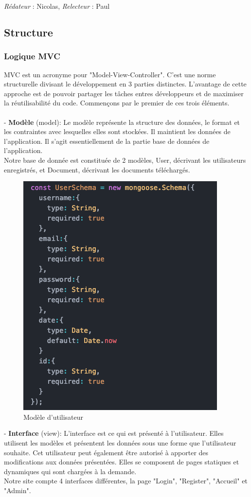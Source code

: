 \documentclass[oneside,a4paper,13pt]{article}
\begin{document}
\smallbreak\textit{Rédateur} : Nicolas, \textit{Relecteur} : Paul
\subsection{Structure}



\subsubsection{Logique MVC}

MVC est un acronyme pour "Model-View-Controller". C'est une norme structurelle divisant le développement en 3 parties distinctes. L'avantage de cette approche est de pouvoir partager les tâches entres développeurs et de maximiser la réutilisabilité du code. Commençons par le premier de ces trois éléments. \\ \\

- \textbf{Modèle} (model): Le modèle représente la structure des données, le format et les contraintes avec lesquelles elles sont stockées. Il maintient les données de l'application. Il s'agit essentiellement de la partie base de données de l'application.\\
Notre base de donnée est constituée de 2 modèles, User, décrivant les utilisateurs enregistrés, et Document, décrivant les documents téléchargés. \\

\begin{figure}[H]
    \centering
        \includegraphics[width=0.3\linewidth]{Backend/Database/user model.png}
        \caption{Modèle d'utilisateur}
        \label{fig:my_label}
\end{figure}

- \textbf{Interface} (view): L'interface est ce qui est présenté à l'utilisateur. Elles utilisent les modèles et présentent les données sous une forme que l'utilisateur souhaite. Cet utilisateur peut également être autorisé à apporter des modifications aux données présentées. Elles se composent de pages statiques et dynamiques qui sont chargées à la demande.\\
Notre site compte 4 interfaces différentes, la page "Login", "Register", "Accueil" et "Admin". \\
\end{document}
